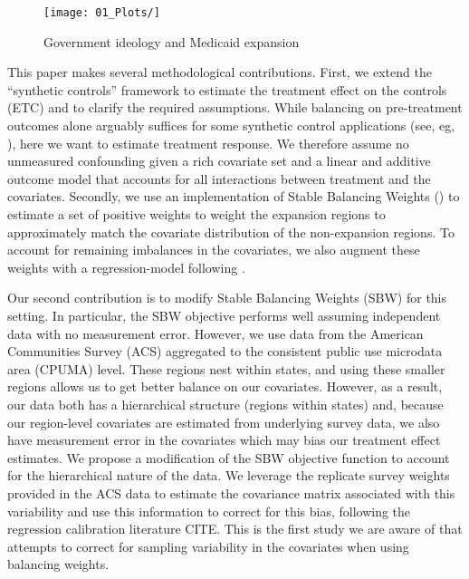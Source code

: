 \documentclass[12pt]{article}
\begin{document}
\begin{figure}
    \begin{center}
    \texttt{[image: 01\_Plots/]}
    \caption{Government ideology and Medicaid expansion}
    \label{fig1}
    \end{center}
\end{figure}

This paper makes several methodological contributions. First, we extend the ``synthetic controls'' framework to estimate the treatment effect on the controls (ETC) and to clarify the required assumptions. While balancing on pre-treatment outcomes alone arguably suffices for some synthetic control applications (see, eg, \cite{botosaru2017role}), here we want to estimate treatment response. We therefore assume no unmeasured confounding given a rich covariate set and a linear and additive outcome model that accounts for all interactions between treatment and the covariates. Secondly, we use an implementation of Stable Balancing Weights (\cite{zubizarreta2015stable}) to estimate a set of positive weights to weight the expansion regions to approximately match the covariate distribution of the non-expansion regions. To account for remaining imbalances in the covariates, we also augment these weights with a regression-model following \cite{ben2018augmented}.

Our second contribution is to modify Stable Balancing Weights (SBW) for this setting. In particular, the SBW objective performs well assuming independent data with no measurement error. However, we use data from the American Communities Survey (ACS) aggregated to the consistent public use microdata area (CPUMA) level. These regions nest within states, and using these smaller regions allows us to get better balance on our covariates. However, as a result, our data both has a hierarchical structure (regions within states) and, because our region-level covariates are estimated from underlying survey data, we also have measurement error in the covariates which may bias our treatment effect estimates. We propose a modification of the SBW objective function to account for the hierarchical nature of the data. We leverage the replicate survey weights provided in the ACS data to estimate the covariance matrix associated with this variability and use this information to correct for this bias, following the regression calibration literature CITE. This is the first study we are aware of that attempts to correct for sampling variability in the covariates when using balancing weights. 
\end{document}
